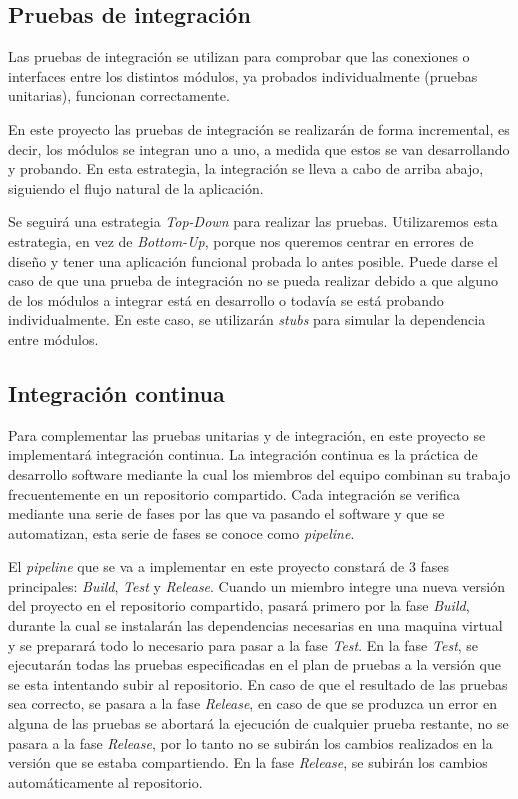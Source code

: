 \subsection{Pruebas de integración}
Las pruebas de integración se utilizan para comprobar que las conexiones o interfaces entre los distintos módulos, ya probados individualmente (pruebas unitarias), funcionan correctamente.

En este proyecto las pruebas de integración se realizarán de forma incremental, es decir, los módulos se integran uno a uno, a medida que estos se van desarrollando y probando. En esta estrategia, la integración se lleva a cabo de arriba abajo, siguiendo el flujo natural de la aplicación.

Se seguirá una estrategia \textit{Top-Down} para realizar las pruebas. Utilizaremos esta estrategia, en vez de \textit{Bottom-Up}, porque nos queremos centrar en errores de diseño y tener una aplicación funcional probada lo antes posible.
Puede darse el caso de que una prueba de integración no se pueda realizar debido a que alguno de los módulos a integrar está en desarrollo o todavía se está probando individualmente. En este caso, se utilizarán \textit{stubs} para simular la dependencia entre módulos.
\subsection{Integración continua}
Para complementar las pruebas unitarias y de integración, en este proyecto se implementará integración continua. La integración continua es la práctica de desarrollo software mediante la cual los miembros del equipo combinan su trabajo frecuentemente en un repositorio compartido. Cada integración se verifica mediante una serie de fases por las que va pasando el software y que se automatizan, esta serie de fases se conoce como \textit{pipeline}.

El \textit{pipeline} que se va a implementar en este proyecto constará de 3 fases principales: \textit{Build}, \textit{Test} y \textit{Release}. Cuando un miembro integre una nueva versión del proyecto en el repositorio compartido, pasará primero por la fase \textit{Build}, durante la cual se instalarán las dependencias necesarias en una maquina virtual y se preparará todo lo necesario para pasar a la fase \textit{Test}. En la fase \textit{Test}, se ejecutarán todas las pruebas especificadas en el plan de pruebas a la versión que se esta intentando subir al repositorio. En caso de que el resultado de las pruebas sea correcto, se pasara a la fase \textit{Release}, en caso de que se produzca un error en alguna de las pruebas se abortará la ejecución de cualquier prueba restante, no se pasara a la fase \textit{Release}, por lo tanto no se subirán los cambios realizados en la versión que se estaba compartiendo. En la fase \textit{Release}, se subirán los cambios automáticamente al repositorio.

